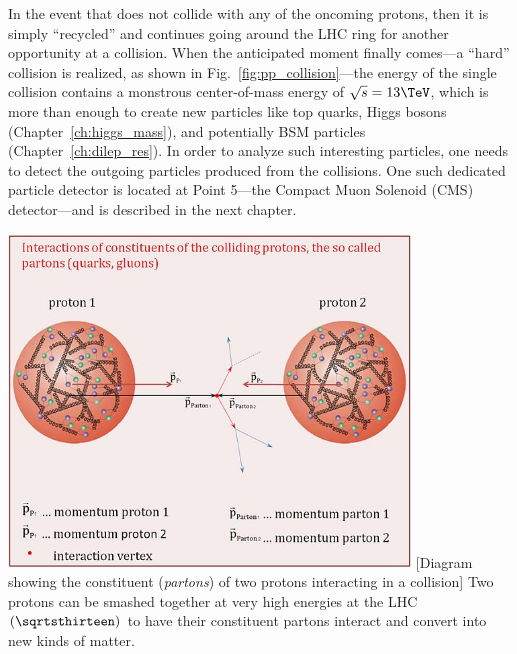 In the event that \pname does not collide with any of the oncoming protons, then it is simply ``recycled'' and continues going around the LHC ring for another opportunity at a \pp collision.
When the anticipated moment finally comes---\ie a ``hard'' \pp collision is realized, as shown in Fig.~\ref{fig:pp_collision}---the energy of the single collision contains a monstrous center-of-mass energy of $\sqrt{s} = 13\TeV$, which is more than enough to create new particles like top quarks, Higgs bosons (Chapter~\ref{ch:higgs_mass}), and potentially BSM particles (Chapter~\ref{ch:dilep_res}).
In order to analyze such interesting particles, one needs to detect the outgoing particles produced from the \pp collisions.
One such dedicated particle detector is located at Point 5---the Compact Muon Solenoid (CMS) detector---and is described in the next chapter.
\begin{multiFigure}
    \centering
    \includegraphics[width=0.8\textwidth]{figures/lhc/proton_proton_quarksandgluons.jpg}
        [Diagram showing the constituent (\emph{partons}) of two protons interacting in a \pp collision]
        {Two protons can be smashed together at very high energies at the LHC $\left( \sqrtsthirteen \right)$ to have their constituent partons interact and convert into new kinds of matter.} 
    \label{fig:pp_collision}
\end{multiFigure}



